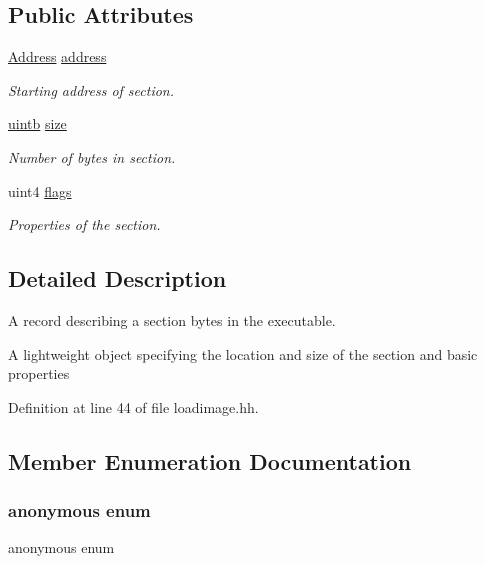 \subsection*{Public Attributes}
\begin{DoxyCompactItemize}
\item 
\mbox{\hyperlink{class_address}{Address}} \mbox{\hyperlink{struct_load_image_section_aacf49d79a9230343f798357f9731f613}{address}}
\begin{DoxyCompactList}\small\item\em Starting address of section. \end{DoxyCompactList}\item 
\mbox{\hyperlink{types_8h_a2db313c5d32a12b01d26ac9b3bca178f}{uintb}} \mbox{\hyperlink{struct_load_image_section_ad11c97bab282432299846b93f28c135b}{size}}
\begin{DoxyCompactList}\small\item\em Number of bytes in section. \end{DoxyCompactList}\item 
uint4 \mbox{\hyperlink{struct_load_image_section_a3cbd878bd8ba2890c81ef5b236633374}{flags}}
\begin{DoxyCompactList}\small\item\em Properties of the section. \end{DoxyCompactList}\end{DoxyCompactItemize}


\subsection{Detailed Description}
A record describing a section bytes in the executable. 

A lightweight object specifying the location and size of the section and basic properties 

Definition at line 44 of file loadimage.\+hh.



\subsection{Member Enumeration Documentation}
\mbox{\label{struct_load_image_section_ac7b4a598883e0a2572f83fb3e9439d94}} 
\subsubsection{\texorpdfstring{anonymous enum}{anonymous enum}}
{\footnotesize\ttfamily anonymous enum}



